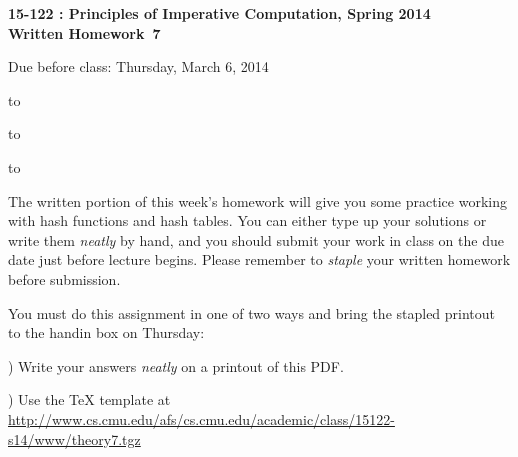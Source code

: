 \documentclass[12pt]{exam}
\newcommand{\hwnumber}{7}
\newcommand{\semester}{Spring 2014}
\begin{document}
\addpoints
\begin{center}
\textbf{\large{15-122 : Principles of Imperative Computation, \semester
\\  \vspace{0.2in} Written Homework~\hwnumber
}}

 \vspace{0.2in}

 \large{Due before class: Thursday, March 6, 2014}
\end{center}

\vspace{0.5in}

\hbox to \textwidth{Name:\enspace\hrulefill}


\vspace{0.2in}

\hbox to \textwidth{Andrew ID:\enspace\hrulefill}

\vspace{0.2in}

\hbox to \textwidth{Recitation:\enspace\hrulefill}


\vspace{0.5in}

\noindent The written portion of this week's homework will give you some
practice working with hash functions and hash tables.
You can either type up your solutions or write them
\textit{neatly} by hand, and you should submit your work in class on the
due date just before lecture begins. Please remember to \textit{staple}
your written homework before submission.
\vspace{0.2in}

\begin{center}
\gradetable[v][questions]
\end{center}

\vspace{0.2in}
\begin{center}
  \Large{You must do this assignment in one of two ways and bring the stapled
         printout to the handin box on Thursday:

) Write your answers \textit{neatly} on a printout of this PDF.

) Use the TeX template at
    \url{http://www.cs.cmu.edu/afs/cs.cmu.edu/academic/class/15122-s14/www/theory7.tgz}
 }
\end{center}
\end{document}
